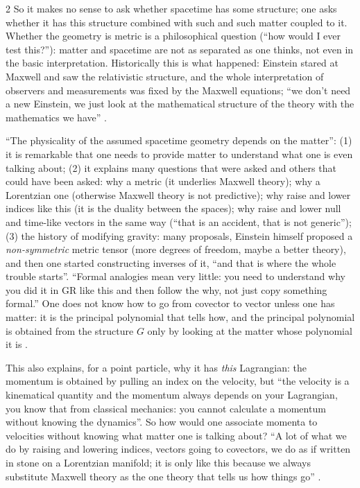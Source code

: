 \begin{paracol}{2}
So it makes no sense to ask whether spacetime has some structure; one asks whether it has this structure combined with such and such matter coupled to it. Whether the geometry is metric is a philosophical question (``how would I ever test this?''): matter and spacetime are not as separated as one thinks, not even in the basic interpretation. Historically this is what happened: Einstein stared at Maxwell and saw the relativistic structure, and the whole interpretation of observers and measurements was fixed by the Maxwell equations; ``we don't need a new Einstein, we just look at the mathematical structure of the theory with the mathematics we have'' .

\begin{remark}
``The physicality of the assumed spacetime geometry depends on the matter'': (1) it is remarkable that one needs to provide matter to understand what one is even talking about; (2) it explains many questions that were asked and others that could have been asked: why a metric (it underlies Maxwell theory); why a Lorentzian one (otherwise Maxwell theory is not predictive); why raise and lower indices like this (it is the duality between the spaces); why raise and lower null and time-like vectors in the same way (``that is an accident, that is not generic''); (3) the history of modifying gravity: many proposals, Einstein himself proposed a \emph{non-symmetric} metric tensor (more degrees of freedom, maybe a better theory), and then one started constructing inverses of it, ``and that is where the whole trouble starts''. ``Formal analogies mean very little: you need to understand why you did it in GR like this and then follow the why, not just copy something formal.'' One does not know how to go from covector to vector unless one has matter: it is the principal polynomial that tells how, and the principal polynomial is obtained from the structure $G$ only by looking at the matter whose polynomial it is .
\end{remark}

This also explains, for a point particle, why it has \emph{this} Lagrangian: the momentum is obtained by pulling an index on the velocity, but ``the velocity is a kinematical quantity and the momentum always depends on your Lagrangian, you know that from classical mechanics: you cannot calculate a momentum without knowing the dynamics''. So how would one associate momenta to velocities without knowing what matter one is talking about? ``A lot of what we do by raising and lowering indices, vectors going to covectors, we do as if written in stone on a Lorentzian manifold; it is only like this because we always substitute Maxwell theory as the one theory that tells us how things go'' .


\end{paracol}
